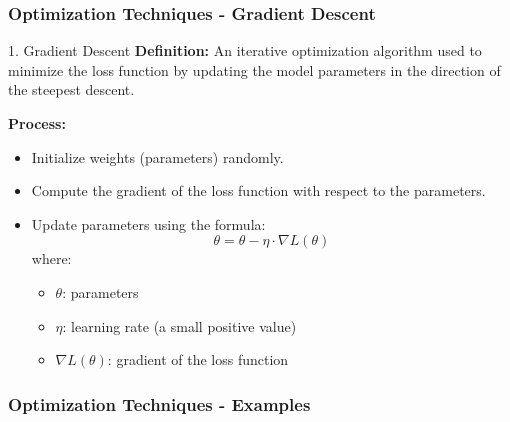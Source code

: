 \documentclass[aspectratio=169]{beamer}
\begin{document}
\begin{frame}[fragile]
    \frametitle{Optimization Techniques - Gradient Descent}
    \begin{block}{1. Gradient Descent}
        \textbf{Definition:} An iterative optimization algorithm used to minimize the loss function by updating the model parameters in the direction of the steepest descent.
        
        \textbf{Process:}
        \begin{itemize}
            \item Initialize weights (parameters) randomly.
            \item Compute the gradient of the loss function with respect to the parameters.
            \item Update parameters using the formula:
            \begin{equation}
                \theta = \theta - \eta \cdot \nabla L(\theta)
            \end{equation}
            where:
            \begin{itemize}
                \item $\theta$: parameters
                \item $\eta$: learning rate (a small positive value)
                \item $\nabla L(\theta)$: gradient of the loss function
            \end{itemize}
        \end{itemize}
    \end{block}
\end{frame}

\begin{frame}[fragile]
    \frametitle{Optimization Techniques - Examples}
\end{frame}
\end{document}
